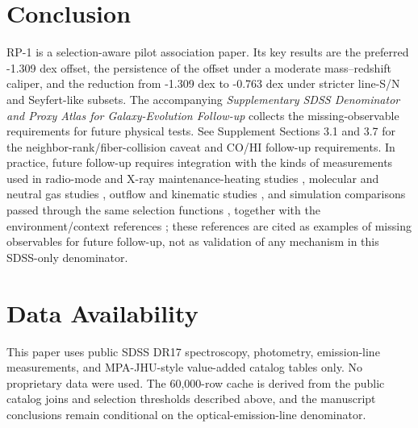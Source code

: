 \documentclass[twocolumn]{aastex631}
\begin{document}
\section{Conclusion}
RP-1 is a selection-aware pilot association paper. Its key results are the preferred -1.309 dex offset, the persistence of the offset under a moderate mass--redshift caliper, and the reduction from -1.309 dex to -0.763 dex under stricter line-S/N and Seyfert-like subsets. The accompanying \emph{Supplementary SDSS Denominator and Proxy Atlas for Galaxy-Evolution Follow-up} collects the missing-observable requirements for future physical tests. See Supplement Sections 3.1 and 3.7 for the neighbor-rank/fiber-collision caveat and CO/HI follow-up requirements.
In practice, future follow-up requires integration with the kinds of measurements used in radio-mode and X-ray maintenance-heating studies \citep{best2005,fabian2012,mcnamara2007,heckmanbest2014,lamassa2013}, molecular and neutral gas studies \citep{xcoldgass2017,xgass2018}, outflow and kinematic studies \citep{veilleux2005,cicone2014,carniani2017,fiore2017}, and simulation comparisons passed through the same selection functions \citep{simba2019,tng2019,eagle2015}, together with the environment/context references \citep{peng2010,ellison2011,piotrowska2022,wetzel2013,dekel2006}; these references are cited as examples of missing observables for future follow-up, not as validation of any mechanism in this SDSS-only denominator.

\section*{Data Availability}
This paper uses public SDSS DR17 spectroscopy, photometry, emission-line measurements, and MPA-JHU-style value-added catalog tables only. No proprietary data were used. The 60,000-row cache is derived from the public catalog joins and selection thresholds described above, and the manuscript conclusions remain conditional on the optical-emission-line denominator.

\end{document}
